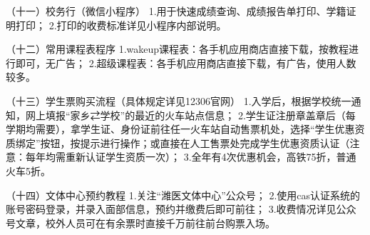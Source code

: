 （十一）校务行（微信小程序）
1.用于快速成绩查询、成绩报告单打印、学籍证明打印；
2.打印的收费标准详见小程序内部说明。

（十二）常用课程表程序
1.wakeup课程表：各手机应用商店直接下载，按教程进行即可，无广告；
2.超级课程表：各手机应用商店直接下载，有广告，使用人数较多。

（十三）学生票购买流程（具体规定详见12306官网）
1.入学后，根据学校统一通知，网上填报“家乡⇄学校”的最近的火车站点信息；
2.学生证注册章盖章后（每学期均需要），拿学生证、身份证前往任一火车站自动售票机处，选择“学生优惠资质绑定”按钮，按提示进行操作；或直接在人工售票处完成学生优惠资质认证（注意：每年均需重新认证学生资质一次）；
3.全年有4次优惠机会，高铁75折，普通火车5折。

（十四）文体中心预约教程
1.关注“潍医文体中心”公众号；
2.使用cas认证系统的账号密码登录，并录入面部信息，预约并缴费后即可前往；
3.收费情况详见公众号文章，校外人员可在有余票时直接千万前往前台购票入场。